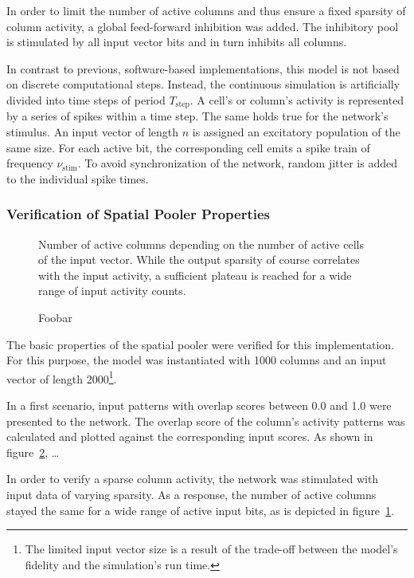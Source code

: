 In order to limit the number of active columns and thus ensure a fixed sparsity of column activity, a global feed-forward inhibition was added. The inhibitory pool is stimulated by all input vector bits and in turn inhibits all columns.

In contrast to previous, software-based implementations, this model is not based on discrete computational steps. Instead, the continuous simulation is artificially divided into time steps of period $T_\text{step}$. A cell's or column's activity is represented by a series of spikes within a time step. The same holds true for the network's stimulus. An input vector of length $n$ is assigned an excitatory population of the same size. For each active bit, the corresponding cell emits a spike train of frequency $\nu_\text{stim}$. To avoid synchronization of the network, random jitter is added to the individual spike times.

\subsubsection{Verification of Spatial Pooler Properties}

\begin{figure}
	\begin{center}
		
	\end{center}
	\caption{Number of active columns depending on the number of active cells of the input vector. While the output sparsity of course correlates with the input activity, a sufficient plateau is reached for a wide range of input activity counts.}
	\label{fig:static_spatial_pooler_sparsity}
\end{figure}

\begin{figure}
	\begin{center}
		
	\end{center}
	\caption{Foobar}
	\label{fig:static_spatial_pooler_overlap}
\end{figure}

The basic properties of the spatial pooler were verified for this implementation. For this purpose, the model was instantiated with 1000 columns and an input vector of length 2000\footnote{The limited input vector size is a result of the trade-off between the model's fidelity and the simulation's run time.}.

In a first scenario, input patterns with overlap scores between 0.0 and 1.0 were presented to the network. The overlap score of the column's activity patterns was calculated and plotted against the corresponding input scores. As shown in figure~\ref{fig:static_spatial_pooler_overlap}, …

In order to verify a sparse column activity, the network was stimulated with input data of varying sparsity. As a response, the number of active columns stayed the same for a wide range of active input bits, as is depicted in figure~\ref{fig:static_spatial_pooler_sparsity}.

